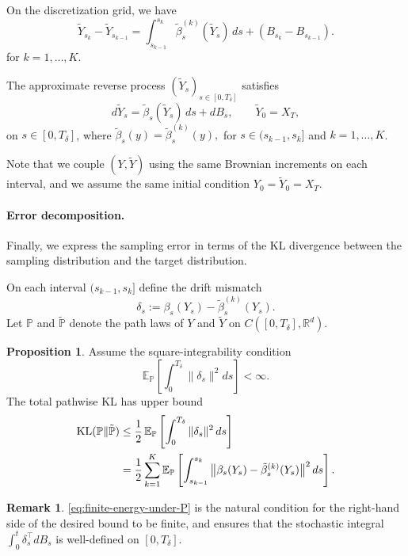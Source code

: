 \documentclass[11pt]{article}
\theoremstyle{definition}
\newtheorem{remark}{Remark}
\newtheorem{proposition}{Proposition}
\numberwithin{equation}{section}
\begin{document}
On the discretization grid, we have 
\begin{equation*}
\tilde Y_{s_k}-\tilde Y_{s_{k-1}}
= \int_{s_{k-1}}^{s_k}\tilde\beta^{(k)}_s(\tilde Y_s)\,ds
+ (B_{s_k}-B_{s_{k-1}}).
\end{equation*}
for $ k=1,\dots,K.$

The approximate reverse process $(\tilde Y_s)_{s\in[0,T_\delta]}$ satisfies
\begin{equation*}
d\tilde Y_s = \tilde\beta_s(\tilde Y_s)\,ds + dB_s,\qquad
\tilde Y_0 = X_{T},
\end{equation*}
on $s\in[0,T_\delta]$, where 
\(\tilde\beta_s(y) = \tilde\beta^{(k)}_s(y),\) for $s\in(s_{k-1},s_k]$ and $k=1,\dots,K$.

Note that we couple $(Y,\tilde Y)$ using the same Brownian increments on each interval, and we assume the same initial condition
$Y_0=\tilde Y_0=X_T$.

\paragraph{Error decomposition.}
Finally, we express the sampling error in terms of the KL divergence between the sampling distribution and the target distribution.

On each interval $(s_{k-1},s_k]$ define the drift mismatch
\begin{equation*}
\delta_s := \beta_s(Y_s)-\tilde\beta^{(k)}_s(Y_s).
\end{equation*}
Let $\mathbb{P}$ and $\tilde{\mathbb{P}}$ denote the path laws of $Y$ and $\tilde Y$ on $C([0,T_\delta],\mathbb{R}^d)$.%




\begin{proposition}\label{prop:KL}
Assume the square-integrability condition
\begin{equation}\label{eq:finite-energy-under-P}
\mathbb{E}_{\mathbb{P}}\!\left[\int_0^{T_\delta}\|\delta_s\|^2ds\right]<\infty.
\end{equation}
The total pathwise KL has upper bound 
\begin{align}
\mathrm{KL}({\mathbb{P}}\|\tilde{\mathbb{P}})
&\leq \frac12\,\mathbb E_{\mathbb{P}}\left[\int_0^{T_\delta}\|\delta_s\|^2\,ds\right]\notag\\
&=\frac12\sum_{k=1}^K
\mathbb E_{{\mathbb{P}}}\left[\int_{s_{k-1}}^{s_k}
\big\|\beta_s(Y_s)-\tilde\beta^{(k)}_s(Y_s)\big\|^2\,ds
\right].
\label{eq:KL-main}
\end{align}
\end{proposition}
\begin{remark}
\eqref{eq:finite-energy-under-P} is the natural condition for the right-hand side of the desired bound to be finite, and ensures that the stochastic integral $\int_0^t \delta_s^\top dB_s$ is well-defined on $[0,T_\delta]$.
\end{remark}
\end{document}

